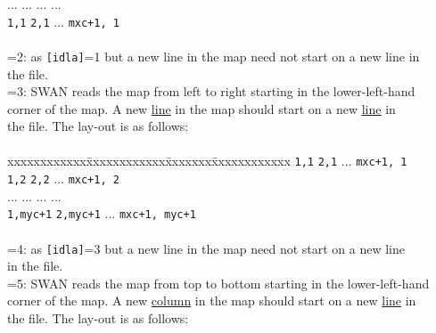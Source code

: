 \documentclass[12pt]{book}
\begin{document}
\begin{tabbing}
                              ...           \> ...           \> ... \> ...              \\
                              {\tt 1,1} \> {\tt 2,1} \> ... \> {\tt mxc+1, 1} \\
                              \poptabs
                              \-\\
                       =2: \> as {\tt [idla]}=1 but a new line in the map need not start on a new line in\+\\
                              the file.\-\\
                       =3: \> SWAN reads the map from left to right starting in the lower-left-hand\+\\
                              corner of the map. A new \underline{line} in the map should start on a new \underline{line} in\\
                              the file. The lay-out is as follows:\\
                              \\
                              \pushtabs
                              xxxxxxxxxxxx\=xxxxxxxxxxxx\=xxxxxxx\=xxxxxxxxxxxx \kill
                              {\tt 1,1} \> {\tt 2,1} \> ... \> {\tt mxc+1, 1} \\
                              {\tt 1,2} \> {\tt 2,2} \> ... \> {\tt mxc+1, 2} \\
                              ...           \> ...           \> ... \> ...              \\
                              {\tt 1,myc+1} \> {\tt 2,myc+1} \> ... \> {\tt mxc+1, myc+1} \\
                              \poptabs
                              \-\\
                       =4: \> as {\tt [idla]}=3 but a new line in the map need not start on a new line\+\\
                              in the file.\-\\
                       =5: \> SWAN reads the map from top to bottom starting in the lower-left-hand\+\\
                              corner of the map. A new \underline{column} in the map should start on a new \underline{line} in\\
                              the file. The lay-out is as follows:\\
                              \\
                              \pushtabs

\end{tabbing}
\end{document}
